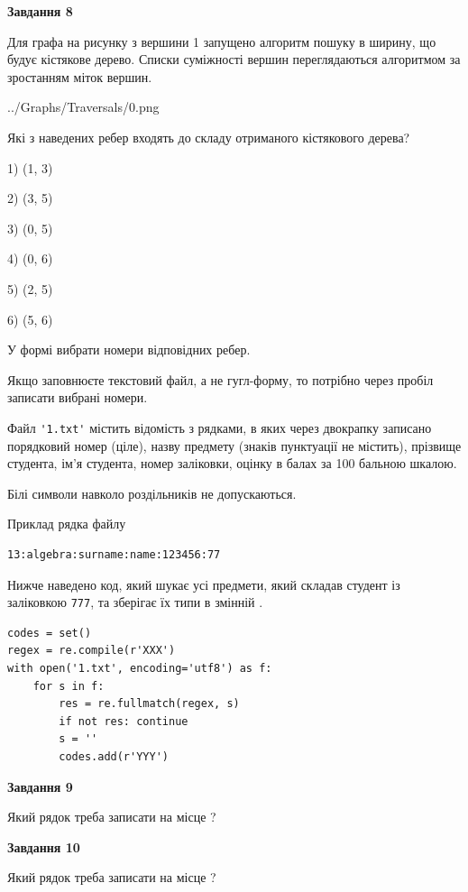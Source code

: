 \documentclass[12pt, ukrainian]{article}
\def\code#1{\Verb!#1!}
\begin{document}
{\begin {large}
{\begin {center}\textbf{Завдання 8}\end {center}}\par
Для графа на рисунку з вершини 1 запущено алгоритм пошуку в ширину, що будує кістякове дерево. Списки суміжності вершин переглядаються алгоритмом за зростанням міток вершин.\par
\begin{center}
	{../Graphs/Traversals/0.png}
\end{center}
\par Які з наведених ребер входять до складу отриманого кістякового дерева?\par
1) (1, 3)\par
2) (3, 5)\par
3) (0, 5)\par
4) (0, 6)\par
5) (2, 5)\par
6) (5, 6)\par
{\vskip 15pt} У формі вибрати номери відповідних ребер.


Якщо заповнюєте текстовий файл, а не гугл-форму, то потрібно через пробіл записа\-ти вибрані номери.\par
\newpage


Файл \code{'1.txt'} містить відомість з рядками, в яких через двокрапку записано поряд\-ковий номер (ціле), назву предмету (знаків пунктуації не містить), прізвище студента, ім'я студента, номер заліковки, оцінку в балах за 100 бальною шкалою.

Білі символи навколо роздільників не допускаються.

Приклад рядка файлу



\begin{verbatim}
13:algebra:surname:name:123456:77
\end{verbatim}


Нижче наведено код, який шукає усі предмети, який складав студент із заліковкою \code{777}, та зберігає їх типи в змінній .



\begin{verbatim}
codes = set()
regex = re.compile(r'XXX')
with open('1.txt', encoding='utf8') as f:
    for s in f:
        res = re.fullmatch(regex, s)
        if not res: continue
        s = ''
        codes.add(r'YYY')
\end{verbatim}


{\begin {center}\textbf{Завдання 9}\end {center}}\par
Який рядок треба записати на місце  ?\par
\vspace{5mm}


{\begin {center}\textbf{Завдання 10}\end {center}}\par
Який рядок треба записати на місце  ?\par


\newpage


\end {large}}
\end{document}
